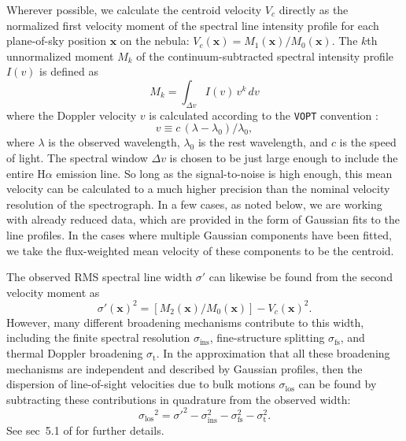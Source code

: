 \documentclass[fleqn,usenatbib, useAMS, a4paper]{mnras}
\newcommand\los{\ensuremath{_{\mathrm{los}}}}
\newcommand\ha{\ensuremath{\text{H}\alpha}}
\begin{document}
\newcommand\xx{\ensuremath{\boldsymbol{x}}}
Wherever possible, we calculate the centroid velocity \(V_c\)
directly as the normalized first velocity moment of the spectral line intensity profile
for each plane-of-sky position \(\xx\) on the nebula:
\(V_{c}(\xx) = M_1(\xx) / M_0(\xx)\).
The \(k\)th unnormalized moment \(M_k\) of the continuum-subtracted
spectral intensity profile \(I(v)\)
is defined as
\begin{equation}
  \label{eq:kth-moment}
  M_k = \int_{\Delta v} I(v) \, v^k \, dv
\end{equation}
where the Doppler velocity \(v\) is calculated according to
the \texttt{VOPT} convention
\citetext{Eq.~[32] of \citealt{Greisen:2006a}}:
\begin{equation}
  \label{eq:optical-velocity}
  v \equiv c\, (\lambda - \lambda_0) / \lambda_0 ,
\end{equation}
where \(\lambda\) is the observed wavelength,
\(\lambda_0\) is the rest wavelength, and \(c\) is the speed of light.
The spectral window \(\Delta v\) is chosen to be just large enough to include
the entire \ha{} emission line.
So long as the signal-to-noise is high enough,
this mean velocity can be calculated to a much higher precision
than the nominal velocity resolution of the spectrograph. 
In a few cases, as noted below, we are working with already reduced data,
which are provided in the form of Gaussian fits to the line profiles.
In the cases where multiple Gaussian components have been fitted,
we take the flux-weighted mean velocity of these components to be the centroid.

The observed RMS spectral line width \(\sigma'\) can likewise be found from
the second velocity moment as
\begin{equation}
  \label{eq:observed-sigma}
  \sigma'(\xx)^2  = [M_2(\xx) / M_0(\xx)] - V_{c}(\xx)^2 .
\end{equation}
However, many different broadening mechanisms contribute to this width,
including the finite spectral resolution \(\sigma_{\mathrm{ins}}\),
fine-structure splitting \(\sigma_{\mathrm{fs}}\),
and thermal Doppler broadening \(\sigma_{\mathrm{t}}\).
In the approximation that all these broadening mechanisms are independent
and described by Gaussian profiles, then the dispersion of
line-of-sight velocities due to bulk motions \(\sigma\los\) can be found
by subtracting these contributions in quadrature from the observed width:
\begin{equation}
  \label{eq:sigma-los}
  \sigma\los^2 = \sigma'^2 - \sigma_{\mathrm{ins}}^2 - \sigma_{\mathrm{fs}}^2 - \sigma_{\mathrm{t}}^2 .
\end{equation}
See sec~5.1 of \citet{Garcia-Diaz:2008a} for further details.
\end{document}
